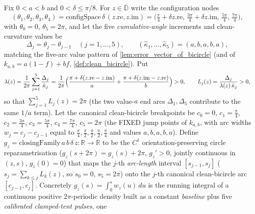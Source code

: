 \begin{definition}
  \label{def:closing_family}
  Fix $0<a<b$ and $0<\delta\le\pi/8$. For $z\in\overline{\mathbb{D}}$ write the
  configuration nodes
  \[
    (\theta_1,\theta_2,\theta_3,\theta_4)=\mathrm{configSpace}\,\delta\,(z.\mathrm{re},z.\mathrm{im})
    =\bigl(\tfrac{\pi}{4}+\delta z.\mathrm{re},\,\tfrac{3\pi}{4}+\delta z.\mathrm{im},\,\tfrac{5\pi}{4},\,\tfrac{7\pi}{4}\bigr),
  \]
  with $\theta_0=0$, $\theta_5=2\pi$, and let the five \emph{cumulative-angle}
  increments and clean-curvature values be
  \[
    \Delta_j=\theta_j-\theta_{j-1}\quad(j=1,\dots,5),\qquad
    (\hat\kappa_1,\dots,\hat\kappa_5)=(a,b,a,b,a),
  \]
  matching the five-arc value pattern of \cref{lem:error_vector_of_bicircle}
  (and of $k_{a,b}=a(1-f)+bf$, \cref{def:clean_bicircle}). Put
  \[
    \lambda(z)=\frac1{2\pi}\sum_{j=1}^5\frac{\Delta_j}{\hat\kappa_j}
      =\frac1{2\pi}\Bigl(\frac{\pi+\delta(z.\mathrm{re}-z.\mathrm{im})}{a}
        +\frac{\pi+\delta(z.\mathrm{im}-z.\mathrm{re})}{b}\Bigr)>0,
    \qquad L_j(z)=\frac{\Delta_j}{\lambda(z)\,\hat\kappa_j}>0,
  \]
  so that $\sum_{j=1}^5 L_j(z)=2\pi$ (the two value-$a$ end arcs
  $\Delta_1,\Delta_5$ contribute to the same $1/a$ term). Let the canonical
  clean-bicircle breakpoints be $c_0=0$, $c_1=\tfrac{\pi}{4}$, $c_2=\tfrac{3\pi}{4}$,
  $c_3=\tfrac{5\pi}{4}$, $c_4=\tfrac{7\pi}{4}$, $c_5=2\pi$ (the FIXED jump points of
  $k_{a,b}$, with arc widths $w_j=c_j-c_{j-1}$ equal to
  $\tfrac{\pi}{4},\tfrac{\pi}{2},\tfrac{\pi}{2},\tfrac{\pi}{2},\tfrac{\pi}{4}$ and
  values $a,b,a,b,a$). Define $g_z=\mathrm{closingFamily}\,a\,b\,\delta\,z:\mathbb{R}\to\mathbb{R}$
  to be the $C^1$ orientation-preserving circle reparametrisation
  ($g_z(s+2\pi)=g_z(s)+2\pi$, $g_z'>0$, jointly continuous in $(z,s)$, $g_z(0)=0$)
  that maps the $j$-th \emph{arc-length} interval $[s_{j-1},s_j]$
  ($s_j=\sum_{k\le j}L_k(z)$, so $s_0=0$, $s_5=2\pi$) onto the $j$-th canonical
  clean-bicircle arc $[c_{j-1},c_j]$. Concretely $g_z(s)=\int_0^s w_z(u)\,du$ is the
  running integral of a continuous positive $2\pi$-periodic density built as a
  constant \emph{baseline} plus five \emph{calibrated clamped-tent pulses}, one

\end{definition}
